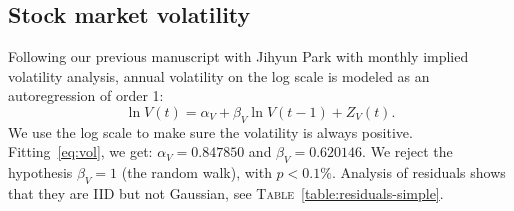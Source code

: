 \documentclass[12pt]{amsart}
\begin{document}
\subsection{Stock market volatility} Following our previous manuscript with Jihyun Park with monthly implied volatility analysis, annual volatility on the log scale is modeled as an autoregression of order 1:
\begin{equation}
\label{eq:vol}
\ln V(t) = \alpha_V  + \beta_V\ln V(t-1) + Z_V(t).
\end{equation}
We use the log scale to make sure the volatility is always positive. Fitting~\eqref{eq:vol}, we get: $\alpha_V = 0.847850$ and $\beta_V = 0.620146$. We reject the hypothesis $\beta_V = 1$ (the random walk), with $p < 0.1\%$. Analysis of residuals shows that they are IID but not Gaussian, see \textsc{Table}~\ref{table:residuals-simple}.
\end{document}
